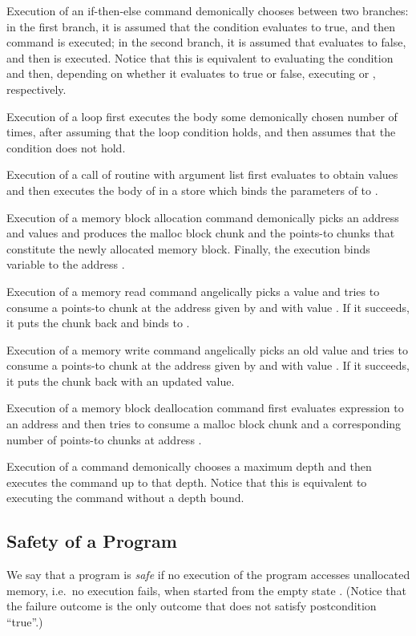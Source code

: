 \documentclass{CSML}
\theoremstyle{definition}\newtheorem{notation}[thm]{Notation}
\theoremstyle{plain}\newtheorem{satz}[thm]{Satz}
\begin{document}
Execution of an if-then-else command  demonically chooses 
between two branches: in the first branch, it is assumed that 
the condition  evaluates to true, and then command  is 
executed; in the second branch, it is assumed that  
evaluates to false, and then  is executed. Notice that this 
is equivalent to evaluating the condition and then, depending 
on whether it evaluates to true or false, executing  or 
, respectively.

Execution of a loop  first executes the body some demonically chosen number of times, after assuming
that the loop condition holds, and then assumes that the condition does not hold.

Execution of a call  of routine  with 
argument list  first evaluates  to obtain values 
and then executes the body  of  in a 
store which binds the parameters  of  to .

Execution of a memory block allocation command   demonically picks an address  and values 
 and produces the malloc block chunk and the 
points-to chunks that constitute the newly allocated memory block.
Finally, the execution binds variable  to the address .

Execution of a memory read command  angelically
picks a value  and tries to consume a points-to chunk at the
address given by  and with value . If it succeeds, it puts the chunk back and binds  to .

Execution of a memory write command  angelically
picks an old value  and tries to consume a points-to chunk at the
address given by  and with value . If it succeeds, it puts the chunk back with an updated value.

Execution of a memory block deallocation command 
 first evaluates expression  to an address 
and then tries to consume a malloc block chunk and a corresponding number of points-to chunks at address .

Execution of a command demonically chooses a maximum depth and 
then executes the command up to that depth. Notice that this is 
equivalent to executing the command without a depth bound. 

\subsection{Safety of a Program}

We say that a program is \emph{safe} if no execution of the 
program accesses unallocated memory, i.e.~no execution fails, 
when started from the empty state . (Notice that the 
failure outcome is the only outcome that does not satisfy 
postcondition ``true''.)
\end{document}
